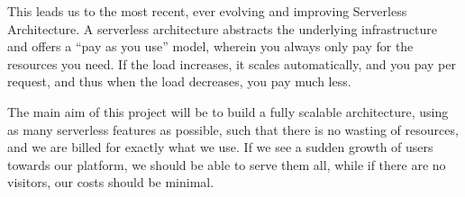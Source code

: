 \smallskip

This leads us to the most recent, ever evolving and improving Serverless Architecture. A serverless architecture abstracts 
the underlying infrastructure and offers a “pay as you use” model, wherein you always only pay for the resources you need. 
If the load increases, it scales automatically, and you pay per request, and thus when the load decreases, you pay much less.

\smallskip

The main aim of this project will be to build a fully scalable architecture, using as many serverless features as possible, 
such that there is no wasting of resources, and we are billed for exactly what we use. If we see a sudden growth of users 
towards our platform, we should be able to serve them all, while if there are no visitors, our costs should be minimal.
